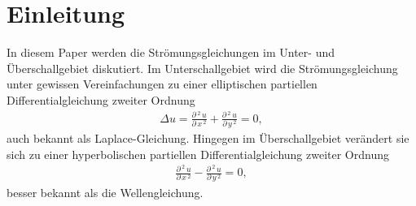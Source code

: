 %
%
%
%
\section{Einleitung\label{ueberschall:Einleitung}}
In diesem Paper werden die Strömungsgleichungen im Unter- und
Überschallgebiet diskutiert.
Im Unterschallgebiet wird die Strömungsgleichung unter gewissen
Vereinfachungen zu einer elliptischen partiellen Differentialgleichung
zweiter Ordnung
\begin{align*}
    \Delta u = \frac{\partial\,^2\,u}{\partial\,x\,^2} +
    \frac{\partial\,^2\,u}{\partial\,y\,^2} = 0, 
\end{align*}
auch bekannt als Laplace-Gleichung.
Hingegen im Überschallgebiet verändert sie sich zu einer hyperbolischen
partiellen Differentialgleichung zweiter Ordnung
\begin{align*}
    \frac{\partial\,^2\,u}{\partial\,x\,^2} -
    \frac{\partial\,^2\,u}{\partial\,y\,^2} = 0, 
\end{align*}
besser bekannt als die Wellengleichung.

